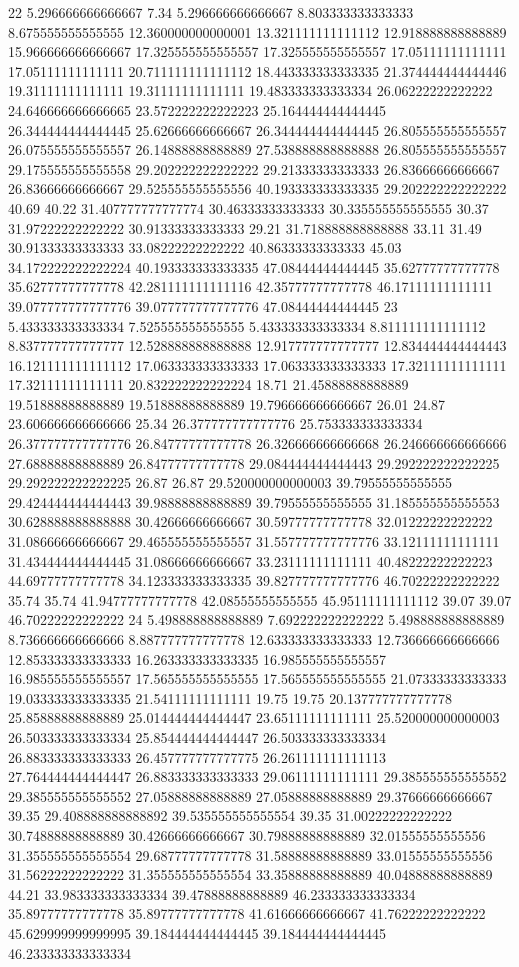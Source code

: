 22 5.296666666666667 7.34 5.296666666666667 8.803333333333333 8.675555555555555 12.360000000000001 13.321111111111112 12.918888888888889 15.966666666666667 17.325555555555557 17.325555555555557 17.05111111111111 17.05111111111111 20.711111111111112 18.443333333333335 21.374444444444446 19.31111111111111 19.31111111111111 19.483333333333334 26.06222222222222 24.646666666666665 23.572222222222223 25.164444444444445 26.344444444444445 25.62666666666667 26.344444444444445 26.805555555555557 26.075555555555557 26.14888888888889 27.538888888888888 26.805555555555557 29.175555555555558 29.202222222222222 29.21333333333333 26.83666666666667 26.83666666666667 29.525555555555556 40.193333333333335 29.202222222222222 40.69 40.22 31.407777777777774 30.46333333333333 30.335555555555555 30.37 31.97222222222222 30.91333333333333 29.21 31.718888888888888 33.11 31.49 30.91333333333333 33.08222222222222 40.86333333333333 45.03 34.172222222222224 40.193333333333335 47.08444444444445 35.62777777777778 35.62777777777778 42.281111111111116 42.35777777777778 46.17111111111111 39.077777777777776 39.077777777777776 47.08444444444445
23 5.433333333333334 7.525555555555555 5.433333333333334 8.811111111111112 8.837777777777777 12.528888888888888 12.917777777777777 12.834444444444443 16.121111111111112 17.063333333333333 17.063333333333333 17.32111111111111 17.32111111111111 20.832222222222224 18.71 21.45888888888889 19.51888888888889 19.51888888888889 19.796666666666667 26.01 24.87 23.606666666666666 25.34 26.377777777777776 25.753333333333334 26.377777777777776 26.84777777777778 26.326666666666668 26.246666666666666 27.68888888888889 26.84777777777778 29.084444444444443 29.292222222222225 29.292222222222225 26.87 26.87 29.520000000000003 39.79555555555555 29.424444444444443 39.98888888888889 39.79555555555555 31.185555555555553 30.628888888888888 30.42666666666667 30.59777777777778 32.01222222222222 31.08666666666667 29.465555555555557 31.557777777777776 33.12111111111111 31.434444444444445 31.08666666666667 33.23111111111111 40.48222222222223 44.69777777777778 34.123333333333335 39.827777777777776 46.70222222222222 35.74 35.74 41.94777777777778 42.08555555555555 45.95111111111112 39.07 39.07 46.70222222222222
24 5.498888888888889 7.692222222222222 5.498888888888889 8.736666666666666 8.887777777777778 12.633333333333333 12.736666666666666 12.853333333333333 16.263333333333335 16.985555555555557 16.985555555555557 17.565555555555555 17.565555555555555 21.07333333333333 19.033333333333335 21.54111111111111 19.75 19.75 20.137777777777778 25.85888888888889 25.014444444444447 23.65111111111111 25.520000000000003 26.503333333333334 25.854444444444447 26.503333333333334 26.883333333333333 26.457777777777775 26.261111111111113 27.764444444444447 26.883333333333333 29.06111111111111 29.385555555555552 29.385555555555552 27.05888888888889 27.05888888888889 29.37666666666667 39.35 29.408888888888892 39.535555555555554 39.35 31.00222222222222 30.74888888888889 30.42666666666667 30.79888888888889 32.01555555555556 31.355555555555554 29.68777777777778 31.58888888888889 33.01555555555556 31.56222222222222 31.355555555555554 33.35888888888889 40.04888888888889 44.21 33.983333333333334 39.47888888888889 46.233333333333334 35.89777777777778 35.89777777777778 41.61666666666667 41.76222222222222 45.629999999999995 39.184444444444445 39.184444444444445 46.233333333333334
